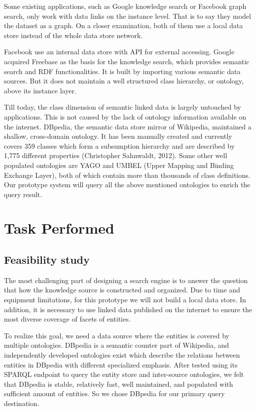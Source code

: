 \documentclass[12pt]{cls}
\begin{document}
Some existing applications, such as Google knowledge search or Facebook graph search, only work with data links on the instance level. That is to say they model the dataset as a graph. On a closer examination, both of them use a local data store instead of the whole data store network.

Facebook use an internal data store with API for external accessing. Google acquired Freebase as the basis for the knowledge search, which provides semantic search and RDF functionalities. It is built by importing various semantic data sources. But it does not maintain a well structured class hierarchy, or ontology, above its instance layer.

Till today, the class dimension of semantic linked data is largely untouched by applications. This is not caused by the lack of ontology information available on the internet. DBpedia, the semantic data store mirror of Wikipedia, maintained a shallow, cross-domain ontology. It has been manually created and currently covers 359 classes which form a subsumption hierarchy and are described by 1,775 different properties (Christopher Sahnwaldt, 2012). Some other well populated ontologies are YAGO and UMBEL (Upper Mapping and Binding Exchange Layer), both of which contain more than thousands of class definitions. Our prototype system will query all the above mentioned ontologies to enrich the query result.

\chapter{Task Performed}

\section{Feasibility study}

The most challenging part of designing a search engine is to answer the question that how the knowledge source is constructed and organized. Due to time and equipment limitations, for this prototype we will not build a local data store. In addition, it is necessary to use linked data published on the internet to ensure the most diverse coverage of facets of entities.

To realize this goal, we need a data source where the entities is covered by multiple ontologies. DBpedia is a semantic counter part of Wikipedia, and independently developed ontologies exist which describe the relations between entities in DBpedia with different specialized emphasis. After tested using its SPARQL endpoint to query the entity store and inter-source ontologies, we felt that DBpedia is stable, relatively fast, well maintained, and populated with sufficient amount of entities. So we chose DBpedia for our primary query destination.
\end{document}
